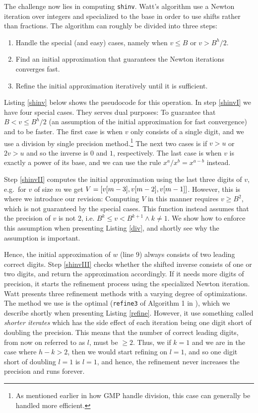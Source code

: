 The challenge now lies in computing \texttt{shinv}. Watt's algorithm use a
Newton iteration over integers and specialized to the base in order to use
shifts rather than fractions. The algorithm can roughly be divided into three
steps:
\begin{enumerate}[label=\Roman*]
\item Handle the special (and easy) cases, namely when $v \leq B$ or $v > B^h/2$.\label{shinvI}
\item Find an initial approximation that guarantees the Newton iterations
  converges fast.\label{shinvII}
\item Refine the initial approximation iteratively until it is sufficient.\label{shinvIII}
\end{enumerate}
Listing \ref{shinv} below shows the pseudocode for this operation. In step
\ref{shinvI} we have four special cases. They serves dual purposes: To guarantee
that $B < v \leq B^h/2$ (an assumption of the initial approximation for fast
convergence) and to be faster. The first case is when $v$ only consists of a
single digit, and we use a division by single precision method.\footnote{As
  mentioned earlier in how GMP handle division, this case can generally be
  handled more efficient.} The next two cases is if $v > u$ or $2v > u$ and so
the inverse is $0$ and $1$, respectively. The last case is when $v$ is exactly a
power of its base, and we can use the rule $x^a/x^b=x^{a-b}$ instead.

Step \ref{shinvII} computes the initial approximation using the last three
digits of $v$, e.g.\ for $v$ of size $m$ we get $V= \mathtt{[}v[m-3],v[m-2],v[m-1]\mathtt{]}$.
However, this is where we introduce our revision: Computing $V$ in this manner
requires $v \geq B^2$, which is not guaranteed by the special cases. This function
instead assumes that the precision of $v$ is not 2, i.e.
$B^k\leq v < B^{k+1} \land k \neq 1$. We show how to enforce this assumption when
presenting Listing \ref{div}, and shortly see why the assumption is important.

Hence, the initial approximation of $w$ (line 9) always consists of two leading
correct digits. Step \ref{shinvIII} checks whether the shifted inverse consists
of one or two digits, and return the approximation accordingly. If it needs more
digits of precision, it starts the refinement process using the specialized
Newton iteration. Watt presents three refinement methods with a varying degree
of optimizations. The method we use is the optimal (\texttt{refine3} of
Algorithm 1 in \cite{watt2023efficient}), which we describe shortly when
presenting Listing \ref{refine}. However, it use something called
\textit{shorter iterates} which has the side effect of each iteration being one
digit short of doubling the precision. This means that the number of correct
leading digits, from now on referred to as $l$, must be $\geq 2$. Thus, we if
$k = 1$ and we are in the case where $h-k>2$, then we would start refining on
$l=1$, and so one digit short of doubling $l=1$ is $l=1$, and hence, the
refinement never increases the precision and runs forever.

